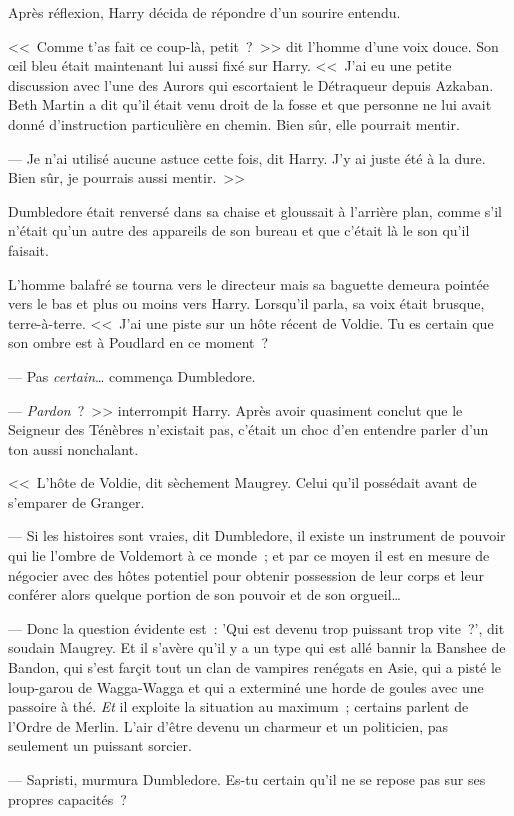 Après réflexion, Harry décida de répondre d'un sourire entendu.

<<~Comme t'as fait ce coup-là, petit~?~>> dit l'homme d'une voix douce. Son œil bleu était maintenant lui aussi fixé sur Harry. <<~J'ai eu une petite discussion avec l'une des Aurors qui escortaient le Détraqueur depuis Azkaban. Beth Martin a dit qu'il était venu droit de la fosse et que personne ne lui avait donné d'instruction particulière en chemin. Bien sûr, elle pourrait mentir.

--- Je n'ai utilisé aucune astuce cette fois, dit Harry. J'y ai juste été à la dure. Bien sûr, je pourrais aussi mentir.~>>

Dumbledore était renversé dans sa chaise et gloussait à l'arrière plan, comme s'il n'était qu'un autre des appareils de son bureau et que c'était là le son qu'il faisait.

L'homme balafré se tourna vers le directeur mais sa baguette demeura pointée vers le bas et plus ou moins vers Harry. Lorsqu'il parla, sa voix était brusque, terre-à-terre. <<~J'ai une piste sur un hôte récent de Voldie. Tu es certain que son ombre est à Poudlard en ce moment~?

--- Pas \emph{certain}… commença Dumbledore.

--- \emph{Pardon}~?~>> interrompit Harry. Après avoir quasiment conclut que le Seigneur des Ténèbres n'existait pas, c'était un choc d'en entendre parler d'un ton aussi nonchalant.

<<~L'hôte de Voldie, dit sèchement Maugrey. Celui qu'il possédait avant de s'emparer de Granger.

--- Si les histoires sont vraies, dit Dumbledore, il existe un instrument de pouvoir qui lie l'ombre de Voldemort à ce monde~; et par ce moyen il est en mesure de négocier avec des hôtes potentiel pour obtenir possession de leur corps et leur conférer alors quelque portion de son pouvoir et de son orgueil…

--- Donc la question évidente est~: 'Qui est devenu trop puissant trop vite~?', dit soudain Maugrey. Et il s'avère qu'il y a un type qui est allé bannir la Banshee de Bandon, qui s'est farçit tout un clan de vampires renégats en Asie, qui a pisté le loup-garou de Wagga-Wagga et qui a exterminé une horde de goules avec une passoire à thé. \emph{Et} il exploite la situation au maximum~; certains parlent de l'Ordre de Merlin. L'air d'être devenu un charmeur et un politicien, pas seulement un puissant sorcier.

--- Sapristi, murmura Dumbledore. Es-tu certain qu'il ne se repose pas sur ses propres capacités~?


